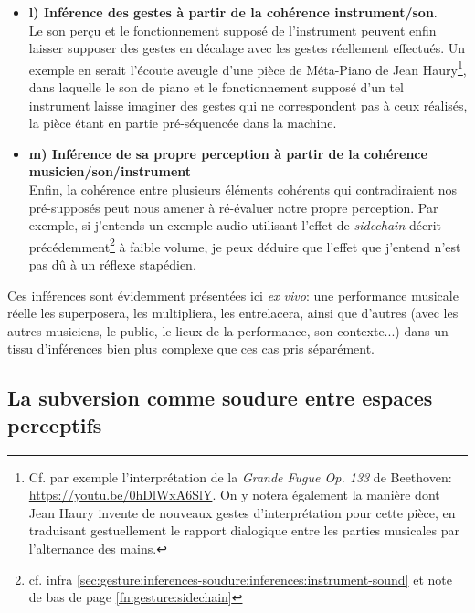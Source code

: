 \begin{itemize}[noitemsep]
	\item \textbf{l) Inférence des gestes à partir de la cohérence instrument/son}.\\
	Le son perçu et le fonctionnement supposé de l'instrument peuvent enfin laisser supposer des gestes en décalage avec les gestes réellement effectués. Un exemple en serait l'écoute aveugle d'une pièce de Méta-Piano de Jean Haury\footnote{Cf. par exemple l'interprétation de la \textit{Grande Fugue Op. 133} de Beethoven: \url{https://youtu.be/0hDlWxA6SlY}. On y notera également la manière dont Jean Haury invente de nouveaux gestes d'interprétation pour cette pièce, en traduisant gestuellement le rapport dialogique entre les parties musicales par l'alternance des mains.}, dans laquelle le son de piano et le fonctionnement supposé d'un tel instrument laisse imaginer des gestes qui ne correspondent pas à ceux réalisés, la pièce étant en partie pré-séquencée dans la machine.
	\item \textbf{m) Inférence de sa propre perception à partir de la cohérence musicien/son/instrument}\\
	Enfin, la cohérence entre plusieurs éléments cohérents qui contradiraient nos pré-supposés peut nous amener à ré-évaluer notre propre perception. Par exemple, si j'entends un exemple audio utilisant l'effet de \textit{sidechain} décrit précédemment\footnote{cf. infra \ref{sec:gesture:inferences-soudure:inferences:instrument-sound} et note de bas de page \ref{fn:gesture:sidechain}} à faible volume, je peux déduire que l'effet que j'entend n'est pas dû à un réflexe stapédien.
\end{itemize}

\noindent Ces inférences sont évidemment présentées ici \textit{ex vivo}: une performance musicale réelle les superposera, les multipliera, les entrelacera, ainsi que d'autres (avec les autres musiciens, le public, le lieux de la performance, son contexte...) dans un tissu d'inférences bien plus complexe que ces cas pris séparément.


\subsection{La subversion comme soudure entre espaces perceptifs}

